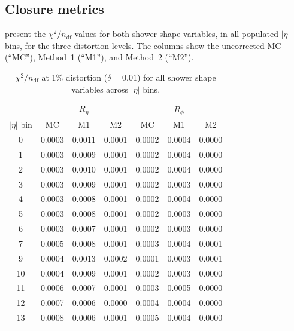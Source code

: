 \documentclass[12pt,a4paper]{article}
\begin{document}
\clearpage

\subsection{Closure metrics}
\label{sec:results:chi2}

 present the
$\chi^2/n_\text{df}$ values for both shower shape variables, in all
populated $|\eta|$ bins, for the three distortion levels. The columns show
the uncorrected MC (``MC''), Method~1 (``M1''), and Method~2 (``M2'').

\begin{table}[htbp]
\centering
\caption{%
  $\chi^2/n_\text{df}$ at 1\% distortion ($\delta=0.01$) for all shower shape
  variables across $|\eta|$ bins.
}
\label{tab:chi2_1pct}
\small
\begin{tabular}{
  c
  S S S
  S S S
}
\toprule
& 
&  \\
\cmidrule(lr){2-4}\cmidrule(lr){5-7}
{$|\eta|$ bin}
& {MC} & {M1} & {M2}
& {MC} & {M1} & {M2} \\
  & 0.0003 & 0.0011 & 0.0001 & 0.0002 & 0.0004 & 0.0000 \\
1  & 0.0003 & 0.0009 & 0.0001 & 0.0002 & 0.0004 & 0.0000 \\
2  & 0.0003 & 0.0010 & 0.0001 & 0.0002 & 0.0004 & 0.0000 \\
3  & 0.0003 & 0.0009 & 0.0001 & 0.0002 & 0.0003 & 0.0000 \\
4  & 0.0003 & 0.0008 & 0.0001 & 0.0002 & 0.0004 & 0.0000 \\
5  & 0.0003 & 0.0008 & 0.0001 & 0.0002 & 0.0003 & 0.0000 \\
6  & 0.0003 & 0.0007 & 0.0001 & 0.0002 & 0.0003 & 0.0000 \\
7  & 0.0005 & 0.0008 & 0.0001 & 0.0003 & 0.0004 & 0.0001 \\
9  & 0.0004 & 0.0013 & 0.0002 & 0.0001 & 0.0003 & 0.0001 \\
10 & 0.0004 & 0.0009 & 0.0001 & 0.0002 & 0.0003 & 0.0000 \\
11 & 0.0006 & 0.0007 & 0.0001 & 0.0003 & 0.0005 & 0.0000 \\
12 & 0.0007 & 0.0006 & 0.0000 & 0.0004 & 0.0004 & 0.0000 \\
13 & 0.0008 & 0.0006 & 0.0001 & 0.0005 & 0.0004 & 0.0000 \\
\bottomrule
\end{tabular}
\end{table}
\end{document}
